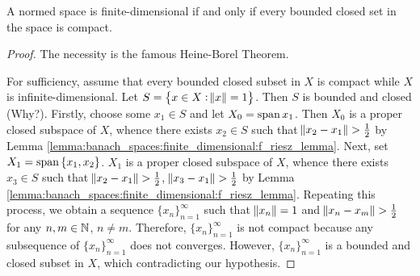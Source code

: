 \begin{thm}
A normed space is finite-dimensional if and only if every bounded closed 
set in the space is compact. 
\end{thm}
\begin{proof}
The necessity is the famous Heine-Borel Theorem. 

For sufficiency, assume that every bounded closed subset in $X$ is compact 
while $X$ is infinite-dimensional. 
Let $S = \left\{ x \in X: \norm{x} = 1\right\}$. 
Then $S$ is bounded and closed (Why?). 
Firstly, choose some $x_1 \in S$ and let $X_0 = \operatorname{span}{x_1}$. 
Then $X_0$ is a proper closed subspace of $X$, whence there exists $x_2 \in 
S$ such that $\norm{x_2 - x_1} > \frac{1}{2}$ by Lemma 
\ref{lemma:banach_spaces:finite_dimensional:f_riesz_lemma}. 
Next, set $X_1 = \operatorname{span} \left\{ x_1, x_2\right\}$. 
$X_1$ is a proper closed subspace of $X$, whence there exists $x_3 \in 
S$ such that $\norm{x_2 - x_1} > \frac{1}{2}$, $\norm{x_3 - x_1} > 
\frac{1}{2}$ by Lemma \ref{lemma:banach_spaces:finite_dimensional:f_riesz_lemma}. 
Repeating this process, we obtain a sequence $\{ x_n \}_{n=1}^{\infty}$ 
such that $\norm{x_n} = 1$ and $\norm{x_n - x_m} > \frac{1}{2}$ for any 
$n, m \in \mathbb{N}$, $n \neq m$. 
Therefore, $\{ x_n \}_{n=1}^{\infty}$ is not compact because any subsequence 
of $\{ x_n \}_{n=1}^{\infty}$ does not converges. 
However, $\{ x_n \}_{n=1}^{\infty}$ is a bounded and closed subset in $X$, 
which contradicting our hypothesis. 
\end{proof}
